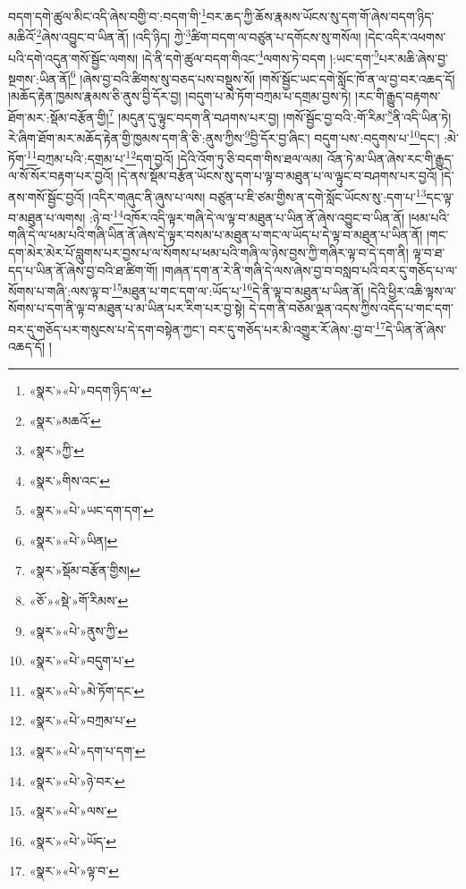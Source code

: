 བདག་དགེ་ཚུལ་མིང་འདི་ཞེས་བགྱི་བ་:བདག་གི་\footnote{«སྣར་»«པེ་»བདག་ཉིད་ལ་}བར་ཆད་ཀྱི་ཆོས་རྣམས་ཡོངས་སུ་དག་གོ་ཞེས་བདག་ཉིད་མཆིའོ་\footnote{«སྣར་»མཆའོ་}ཞེས་འབྱུང་བ་ཡིན་ནོ། །འདི་ཉིད། ཀྱེ་\footnote{«སྣར་»ཀྱི་}ཚིག་བདག་ལ་བཙུན་པ་དགོངས་སུ་གསོལ། །དེང་འདིར་འཕགས་པའི་དགེ་འདུན་གསོ་སྦྱོང་ལགས། །དེ་ནི་དགེ་ཚུལ་བདག་གིའང་\footnote{«སྣར་»གིས་འང་}ལགས་ཏེ་བདག །:ཡང་དག་\footnote{«སྣར་»«པེ་»ཡང་དག་དག་}པར་མཆི་ཞེས་བྱ་སྔགས་:ཡིན་ནོ།\footnote{«སྣར་»«པེ་»ཡིན།} །ཞེས་བྱ་བའི་ཚིགས་སུ་བཅད་པས་བསྡུས་སོ། །གསོ་སྦྱོང་ཡང་དགེ་སློང་ཁོ་ན་ལ་བྱ་བར་འཆད་དོ། །མཆོད་རྟེན་ཁྱམས་རྣམས་ཅི་ནུས་བྱི་དོར་བྱ། །བདུག་པ་མེ་ཏོག་བཀྲམ་པ་དགྲམ་བྱས་ཏེ། །རང་གི་རྒྱུད་བརྟགས་ཐོག་མར་:སྡོམ་བརྩོན་གྱི།\footnote{«སྣར་»སྡོམ་བརྩོན་གྱིས།} །མདུན་དུ་ལྟུང་བདག་ནི་བཤགས་པར་བྱ། །གསོ་སྦྱོང་བྱ་བའི་:གོ་རིམ་\footnote{«ཅོ་»«སྡེ་»གོ་རིམས་}ནི་འདི་ཡིན་ཏེ། རེ་ཞིག་ཐོག་མར་མཆོད་རྟེན་གྱི་ཁྱམས་དག་ནི་ཅི་:ནུས་ཀྱིས་\footnote{«སྣར་»«པེ་»ནུས་ཀྱི་}བྱི་དོར་བྱ་ཞིང་། བདུག་པས་:བདུགས་པ་\footnote{«སྣར་»«པེ་»བདུག་པ་}དང་། :མེ་ཏོག་\footnote{«སྣར་»«པེ་»མེ་ཏོག་དང་}བཀྲམ་པའི་:དགྲམ་པ་\footnote{«སྣར་»«པེ་»བཀྲམ་པ་}དག་བྱའོ། །དེའི་འོག་ཏུ་ཅི་བདག་གིས་ཐལ་ལམ། འོན་ཏེ་མ་ཡིན་ཞེས་རང་གི་རྒྱུད་ལ་སོ་སོར་བརྟག་པར་བྱའོ། །དེ་ནས་སྡོམ་བརྩོན་ཡོངས་སུ་དག་པ་ལྟ་བ་མཐུན་པ་ལ་ལྟུང་བ་བཤགས་པར་བྱའོ། །དེ་ནས་གསོ་སྦྱོང་བྱའོ། །འདིར་གཞུང་ནི་ཞུས་པ་ལས། བཙུན་པ་ཇི་ཙམ་གྱིས་ན་དགེ་སློང་ཡོངས་སུ་:དག་པ་\footnote{«སྣར་»«པེ་»དག་པ་དག་}དང་ལྟ་བ་མཐུན་པ་ལགས། :ཉེ་བ་\footnote{«སྣར་»«པེ་»ཉེ་བར་}འཁོར་འདི་ལྟར་གཞི་དེ་ལ་ལྟ་བ་མཐུན་པ་ཡིན་ནོ་ཞེས་འབྱུང་བ་ཡིན་ནོ། །ཕམ་པའི་གཞི་དེ་ལ་ཕམ་པའི་གཞི་ཡིན་ནོ་ཞེས་དེ་ལྟར་བསམ་པ་མཐུན་པ་གང་ལ་ཡོད་པ་དེ་ལྟ་བ་མཐུན་པ་ཡིན་ནོ། །གང་དག་མེར་མེར་པོ་བླུགས་པར་བྱས་པ་ལ་སོགས་པ་ཕམ་པའི་གཞི་ལ་ཉེས་བྱས་ཀྱི་གཞིར་ལྟ་བ་དེ་དག་ནི། ལྟ་བ་ཐ་དད་པ་ཡིན་ནོ་ཞེས་བྱ་བའི་ཐ་ཚིག་གོ། །གཞན་དག་ན་རེ་ནི་གཞི་དེ་ལས་ཞེས་བྱ་བ་བསླབ་པའི་བར་དུ་གཅོད་པ་ལ་སོགས་པ་གཞི་:ལས་ལྟ་བ་\footnote{«སྣར་»«པེ་»ལས་}མཐུན་པ་གང་དག་ལ་:ཡོད་པ་\footnote{«སྣར་»«པེ་»ཡོད་}དེ་ནི་ལྟ་བ་མཐུན་པ་ཡིན་ནོ། །དེའི་ཕྱིར་འཆི་ལྟས་ལ་སོགས་པ་དག་ནི་ལྟ་བ་མཐུན་པ་མ་ཡིན་པར་རིག་པར་བྱ་སྟེ། དེ་དག་ནི་བཅོམ་ལྡན་འདས་ཀྱིས་འདོད་པ་གང་དག་བར་དུ་གཅོད་པར་གསུངས་པ་དེ་དག་བསྟེན་ཀྱང་། བར་དུ་གཅོད་པར་མི་འགྱུར་རོ་ཞེས་:བྱ་བ་\footnote{«སྣར་»«པེ་»ལྟ་བ་}དེ་ཡིན་ནོ་ཞེས་འཆད་དོ། །
